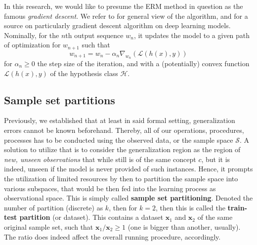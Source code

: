 \documentclass[10pt,oneside,oldfontcommands,dvipsnames,article]{memoir}
\begin{document}
In this research, we would like to presume the ERM method in question as the famous \textit{gradient descent}. We refer to \cite{achlioptas_stochastic_nodate,ruder_overview_2017} for general view of the algorithm, and \cite{zhang_gradient_2019} for a source on particularly gradient descent algorithm on deep learning models. Nominally, for the $n$th output sequence $w_{n}$, it updates the model to a given path of optimization for $w_{n+1}$ such that 
\begin{equation}
    w_{n+1} = w_{n} - \alpha_{n}\nabla_{w_{n}}(\mathcal{L}(h(x),y))
\end{equation}
for $\alpha_{n}\geq 0$ the step size of the iteration, and with a (potentially) convex function $\mathcal{L}(h(x),y)$ of the hypothesis class $\mathcal{H}$. 

\subsection{Sample set partitions}
Previously, we established that at least in said formal setting, generalization errors cannot be known beforehand. Thereby, all of our operations, procedures, processes has to be conducted using the observed data, or the sample space $\mathcal{S}$. A solution to utilize that is to consider the generalization region as the region of \textit{new, unseen observations} that while still is of the same concept $c$, but it is indeed, unseen if the model is never provided of such instances. Hence, it prompts the utilization of limited resources by then to partition the sample space into various subspaces, that would be then fed into the learning process as observational space. This is simply called \textbf{sample set partitioning}. Denoted the number of partition (discrete) as $k$, then for $k=2$, then this is called the \textbf{train-test partition} (or dataset). This contains a dataset $\mathbf{x}_{1}$ and $\mathbf{x}_{2}$ of the same original sample set, such that $\mathbf{x}_{1}/\mathbf{x}_{2}\geq 1$ (one is bigger than another, usually). The ratio does indeed affect the overall running procedure, accordingly.
\end{document}
